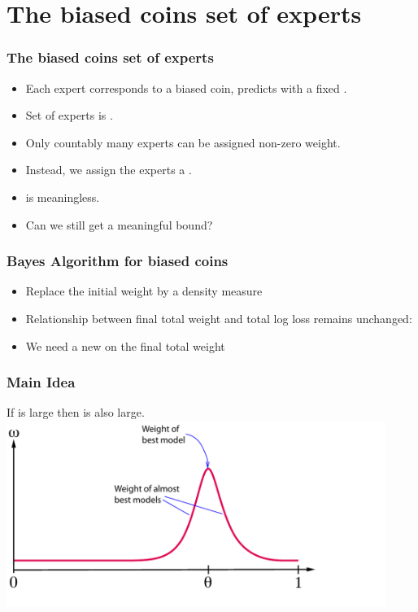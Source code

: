 \documentclass{beamer}
\begin{document}
\section{The biased coins set of experts}
\begin{frame}
\frametitle{The biased coins set of experts}
\begin{itemize}
\item Each expert corresponds to a biased coin, predicts with a fixed \R{$\theta \in [0,1]$}.
\item Set of experts is .
\item Only countably many experts can be assigned non-zero weight.
\item Instead, we assign the experts a .
\item {} is meaningless.
\item Can we still get a meaningful bound?
\end{itemize}
\end{frame}


\begin{frame}
\frametitle{Bayes Algorithm for biased coins}
\begin{itemize}
\item 
Replace the initial weight by a density measure 
\item 
Relationship between final total weight and total log loss remains unchanged:
\R{\[
 \TAloss = \ln \int_0^1 \dweight{\theta}{} e^{-\TEloss{\theta}^{T+1}} d\theta
\]}
\item
We need a new  on the final total weight
\end{itemize}
\end{frame}

 \begin{frame}
\frametitle{Main Idea}
If  is large then  is also large.
~\pause
\includegraphics[height=6cm]{figures/neighborhood.pdf}
\end{frame}
\end{document}
